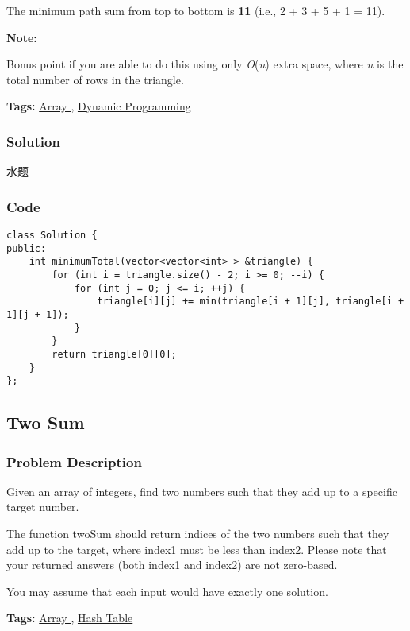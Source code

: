 \documentclass{article}
\begin{document}
\begin{CJK*}{UTF8}{gkai}
The minimum path sum from top to bottom is \textbf{11} (i.e., 2 + 3 + 5 + 1 = 11).

\textbf{Note:}


Bonus point if you are able to do this using only \emph{O}(\emph{n}) extra space, where \emph{n} is the total number of rows in the triangle.


\textbf{Tags: }
\hyperref[ Array ]{ Array },  \hyperref[ Dynamic Programming ]{ Dynamic Programming }



\subsubsection*{Solution}
水题

\subsubsection*{Code}
\begin{lstlisting}
class Solution {
public:
    int minimumTotal(vector<vector<int> > &triangle) {
        for (int i = triangle.size() - 2; i >= 0; --i) {
            for (int j = 0; j <= i; ++j) {
                triangle[i][j] += min(triangle[i + 1][j], triangle[i + 1][j + 1]);
            }
        }
        return triangle[0][0];
    }
}; 
\end{lstlisting}


\subsection{ Two Sum }
\label{ Two Sum }

\subsubsection*{Problem Description}
Given an array of integers, find two numbers such that they add up to a specific target number.

The function twoSum should return indices of the two numbers such that they add up to the target, where index1 must be less than index2. Please note that your returned answers (both index1 and index2) are not zero-based.

You may assume that each input would have exactly one solution.


\textbf{Tags: }
\hyperref[ Array ]{ Array },  \hyperref[ Hash Table ]{ Hash Table }




\end{CJK*}
\end{document}
